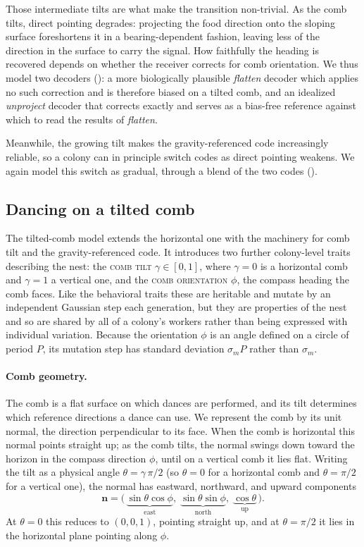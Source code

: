 \documentclass[11pt]{article}
\newcommand{\trait}[1]{\textsc{#1}}
\begin{document}
Those intermediate tilts are what make the transition non-trivial. As the comb
tilts, direct pointing degrades: projecting the food direction onto the sloping
surface foreshortens it in a bearing-dependent fashion, leaving less of the
direction in the surface to carry the signal. How faithfully the heading is
recovered depends on whether the receiver corrects for comb orientation. We thus
model two decoders (): a more biologically plausible
\emph{flatten} decoder which applies no such correction and is therefore biased
on a tilted comb, and an idealized \emph{unproject} decoder that corrects
exactly and serves as a bias-free reference against which to read the results of
\emph{flatten}.

Meanwhile, the growing tilt makes the
gravity-referenced code increasingly reliable, so a colony can in principle
switch codes as direct pointing weakens. We again model this switch as gradual,
through a blend of the two codes ().

\subsection{Dancing on a tilted comb}
\label{sec:vertical}
The tilted-comb model extends the horizontal one with the machinery for comb
tilt and the gravity-referenced code. It introduces two further
colony-level traits describing the nest: the \trait{comb tilt} $\gamma \in [0,1]$,
where $\gamma = 0$ is a horizontal comb and $\gamma = 1$ a vertical one, and the
\trait{comb orientation} $\phi$, the compass heading the comb faces. Like the
behavioral traits these are heritable and mutate by an independent Gaussian step
each generation, but they are
properties of the nest and so are shared by all of a colony's workers rather than
being expressed with individual variation. Because the orientation $\phi$ is an angle
defined on a circle of period $P$, its mutation step has standard deviation
$\sigma_m P$ rather than $\sigma_m$.

\paragraph{Comb geometry.}
The comb is a flat surface on which dances are performed, and its tilt determines
which reference directions a dance can use. We represent the comb by its unit
normal, the direction perpendicular to its face. When the comb is horizontal
this normal points straight up; as the comb tilts, the normal swings down toward
the horizon in the compass direction $\phi$, until on a vertical comb it lies
flat. Writing the tilt as a physical angle $\theta = \gamma\,\pi/2$ (so
$\theta = 0$ for a horizontal comb and $\theta = \pi/2$ for a vertical one), the
normal has eastward, northward, and upward components
\begin{equation}
  \mathbf{n} = \bigl(\,
    \underbrace{\sin\theta\cos\phi}_{\text{east}},\;
    \underbrace{\sin\theta\sin\phi}_{\text{north}},\;
    \underbrace{\cos\theta}_{\text{up}}
  \,\bigr).
\end{equation}
At $\theta = 0$ this reduces to $(0,0,1)$, pointing straight up, and at
$\theta = \pi/2$ it lies in the horizontal plane pointing along $\phi$.
\end{document}
